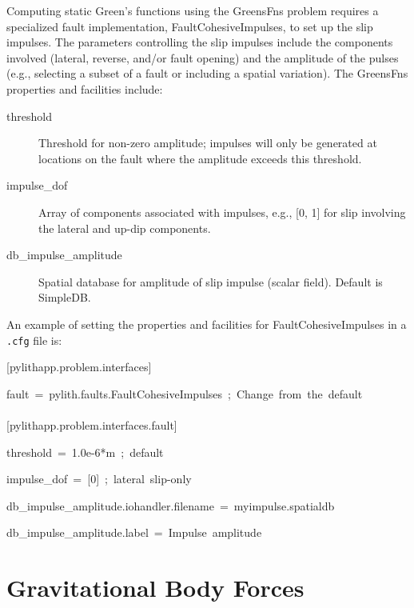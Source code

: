 Computing static Green's functions using the GreensFns problem requires
a specialized fault implementation, FaultCohesiveImpulses, to set
up the slip impulses. The parameters controlling the slip impulses
include the components involved (lateral, reverse, and/or fault opening)
and the amplitude of the pulses (e.g., selecting a subset of a fault
or including a spatial variation). The GreensFns properties and facilities
include:
\begin{description}
\item [{threshold}] Threshold for non-zero amplitude; impulses will only
be generated at locations on the fault where the amplitude exceeds
this threshold.
\item [{impulse\_dof}] Array of components associated with impulses, e.g.,
{[}0, 1{]} for slip involving the lateral and up-dip components.
\item [{db\_impulse\_amplitude}] Spatial database for amplitude of slip
impulse (scalar field). Default is SimpleDB.
\end{description}
An example of setting the properties and facilities for FaultCohesiveImpulses
in a \texttt{.cfg} file is:
\begin{lyxcode}
{[}pylithapp.problem.interfaces{]}

fault~=~pylith.faults.FaultCohesiveImpulses~;~Change~from~the~default~\\
~\\
{[}pylithapp.problem.interfaces.fault{]}

threshold~=~1.0e-6{*}m~;~default

impulse\_dof~=~{[}0{]}~;~lateral~slip-only

db\_impulse\_amplitude.iohandler.filename~=~myimpulse.spatialdb

db\_impulse\_amplitude.label~=~Impulse~amplitude
\end{lyxcode}

\section{Gravitational Body Forces}

